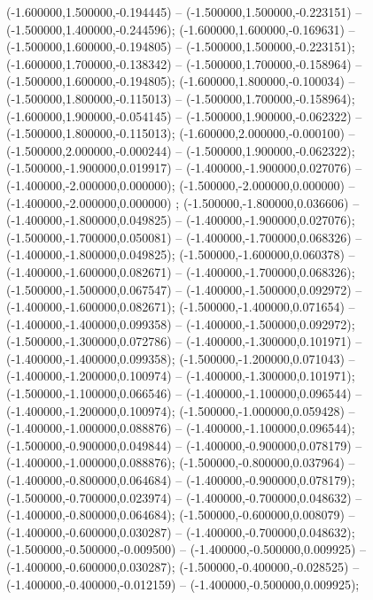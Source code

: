  (-1.600000,1.500000,-0.194445) -- (-1.500000,1.500000,-0.223151) -- (-1.500000,1.400000,-0.244596);
 (-1.600000,1.600000,-0.169631) -- (-1.500000,1.600000,-0.194805) -- (-1.500000,1.500000,-0.223151);
 (-1.600000,1.700000,-0.138342) -- (-1.500000,1.700000,-0.158964) -- (-1.500000,1.600000,-0.194805);
 (-1.600000,1.800000,-0.100034) -- (-1.500000,1.800000,-0.115013) -- (-1.500000,1.700000,-0.158964);
 (-1.600000,1.900000,-0.054145) -- (-1.500000,1.900000,-0.062322) -- (-1.500000,1.800000,-0.115013);
 (-1.600000,2.000000,-0.000100) -- (-1.500000,2.000000,-0.000244) -- (-1.500000,1.900000,-0.062322);
 (-1.500000,-1.900000,0.019917) -- (-1.400000,-1.900000,0.027076) -- (-1.400000,-2.000000,0.000000);
 (-1.500000,-2.000000,0.000000) -- (-1.400000,-2.000000,0.000000) ;
 (-1.500000,-1.800000,0.036606) -- (-1.400000,-1.800000,0.049825) -- (-1.400000,-1.900000,0.027076);
 (-1.500000,-1.700000,0.050081) -- (-1.400000,-1.700000,0.068326) -- (-1.400000,-1.800000,0.049825);
 (-1.500000,-1.600000,0.060378) -- (-1.400000,-1.600000,0.082671) -- (-1.400000,-1.700000,0.068326);
 (-1.500000,-1.500000,0.067547) -- (-1.400000,-1.500000,0.092972) -- (-1.400000,-1.600000,0.082671);
 (-1.500000,-1.400000,0.071654) -- (-1.400000,-1.400000,0.099358) -- (-1.400000,-1.500000,0.092972);
 (-1.500000,-1.300000,0.072786) -- (-1.400000,-1.300000,0.101971) -- (-1.400000,-1.400000,0.099358);
 (-1.500000,-1.200000,0.071043) -- (-1.400000,-1.200000,0.100974) -- (-1.400000,-1.300000,0.101971);
 (-1.500000,-1.100000,0.066546) -- (-1.400000,-1.100000,0.096544) -- (-1.400000,-1.200000,0.100974);
 (-1.500000,-1.000000,0.059428) -- (-1.400000,-1.000000,0.088876) -- (-1.400000,-1.100000,0.096544);
 (-1.500000,-0.900000,0.049844) -- (-1.400000,-0.900000,0.078179) -- (-1.400000,-1.000000,0.088876);
 (-1.500000,-0.800000,0.037964) -- (-1.400000,-0.800000,0.064684) -- (-1.400000,-0.900000,0.078179);
 (-1.500000,-0.700000,0.023974) -- (-1.400000,-0.700000,0.048632) -- (-1.400000,-0.800000,0.064684);
 (-1.500000,-0.600000,0.008079) -- (-1.400000,-0.600000,0.030287) -- (-1.400000,-0.700000,0.048632);
 (-1.500000,-0.500000,-0.009500) -- (-1.400000,-0.500000,0.009925) -- (-1.400000,-0.600000,0.030287);
 (-1.500000,-0.400000,-0.028525) -- (-1.400000,-0.400000,-0.012159) -- (-1.400000,-0.500000,0.009925);
